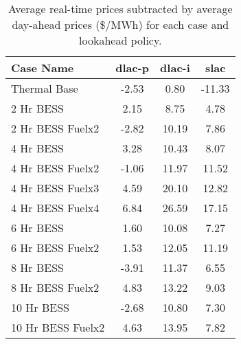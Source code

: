 \begin{table}[H]
\centering
\begin{tabular}{lccc}
\hline
Case Name & dlac-p & dlac-i & slac \\
\hline
Thermal Base & -2.53 & 0.80 & -11.33 \\
2 Hr BESS & 2.15 & 8.75 & 4.78 \\
2 Hr BESS Fuelx2 & -2.82 & 10.19 & 7.86 \\
4 Hr BESS & 3.28 & 10.43 & 8.07 \\
4 Hr BESS Fuelx2 & -1.06 & 11.97 & 11.52 \\
4 Hr BESS Fuelx3 & 4.59 & 20.10 & 12.82 \\
4 Hr BESS Fuelx4 & 6.84 & 26.59 & 17.15 \\
6 Hr BESS & 1.60 & 10.08 & 7.27 \\
6 Hr BESS Fuelx2 & 1.53 & 12.05 & 11.19 \\
8 Hr BESS & -3.91 & 11.37 & 6.55 \\
8 Hr BESS Fuelx2 & 4.83 & 13.22 & 9.03 \\
10 Hr BESS & -2.68 & 10.80 & 7.30 \\
10 Hr BESS Fuelx2 & 4.63 & 13.95 & 7.82 \\
\end{tabular}
\caption{Average real-time prices subtracted by average day-ahead prices (\$/MWh)  for each case and lookahead policy.}
\label{tab:avg_prices_comparison}
\end{table}
